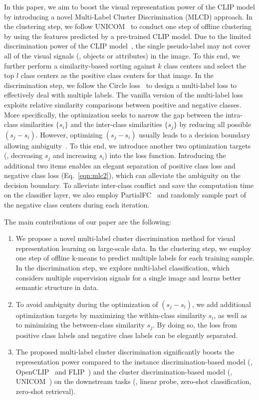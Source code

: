 In this paper, we aim to boost the visual representation power of the CLIP model by introducing a novel Multi-Label Cluster Discrimination (MLCD) approach.
In the clustering step, we follow UNICOM~\cite{an2023unicom} to conduct one step of offline clustering by using the features predicted by a pre-trained CLIP model. Due to the limited discrimination power of the CLIP model~\cite{radford2021learning}, the single pseudo-label may not cover all of the visual signals (\eg, objects or attributes) in the image. To this end, we further perform a similarity-based sorting against $k$ class centers and select the top $l$ class centers as the positive class centers for that image. 
In the discrimination step, we follow the Circle loss~\cite{sun2020circle} to 
design a multi-label loss to effectively deal with multiple labels. The vanilla version of 
the multi-label loss exploits relative similarity comparisons between positive and negative classes. More specifically, the optimization seeks to narrow the gap between the intra-class similarities $\{s_i\}$ and 
the inter-class similarities $\{s_j\}$ by reducing all possible $(s_j-s_i)$. However, optimizing $(s_j-s_i)$
usually leads to a decision boundary allowing ambiguity~\cite{sun2020circle}. To this end, we introduce another two optimization targets (\ie, decreasing $s_j$ and increasing $s_i$) into the loss function. Introducing the additional two items enables an elegant separation of positive class loss and negative class loss (Eq.~\ref{eqn:mlc2}), {which can alleviate the ambiguity on the decision boundary}. To alleviate inter-class conflict and save the computation time on the classifier layer, we also employ PartialFC~\cite{an2022killing} and randomly sample part of the negative class centers during each iteration.  

The main contributions of our paper are the following:
\begin{enumerate}
\item We propose a novel multi-label cluster discrimination method for visual representation learning on large-scale data. In the clustering step, we employ one step of offline k-means to predict multiple labels for each training sample. In the discrimination step, we explore multi-label classification, which considers multiple supervision signals for a single image and learns better semantic structure in data.
\item To avoid ambiguity during the optimization of $(s_j-s_i)$, we add additional optimization targets by maximizing the within-class similarity $s_i$, as well as to minimizing the between-class similarity $s_j$. By doing so, the loss from positive class labels and negative class labels can be elegantly separated.
\item The proposed multi-label cluster discrimination significantly boosts the representation power compared to the instance discrimination-based model (\eg, OpenCLIP~\cite{cherti2023reproducible} and FLIP~\cite{li2023scaling}) and the cluster discrimination-based model (\eg, UNICOM~\cite{an2023unicom}) on the downstream tasks (\eg, linear probe, zero-shot classification, zero-shot retrieval).
\end{enumerate}

